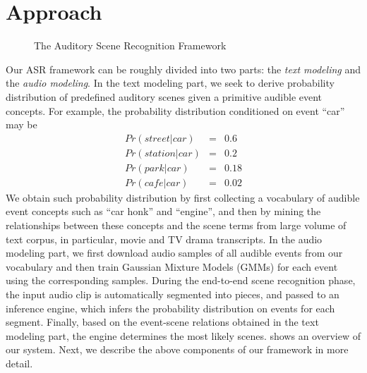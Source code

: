 \section{Approach}
\label{sec:approach}

\begin{figure*}[th]
\centering
{}
\caption{The Auditory Scene Recognition Framework}
\label{fig:sys}
\end{figure*}

Our ASR framework can be roughly divided into two parts: the {\em text 
modeling} and the {\em audio modeling}. In the text modeling part, we seek to
derive probability distribution of predefined auditory scenes given 
a primitive audible event concepts. For example, the probability
distribution conditioned on event ``car'' may be 
\begin{eqnarray*}
Pr(street | car) &=& 0.6\\ 
Pr(station | car) &=& 0.2\\
Pr(park | car) &=& 0.18 \\
Pr(cafe | car) &=& 0.02
\end{eqnarray*}
We obtain such probability distribution by first 
collecting a vocabulary of audible event
concepts such as ``car honk'' and ``engine'', and then by mining the 
relationships between these concepts and the scene terms from large 
volume of text corpus, in particular, movie and TV drama transcripts. 
In the audio modeling part, we first download audio samples of all audible
events from our vocabulary and then train Gaussian Mixture Models (GMMs)
for each event using the corresponding samples. 
During the end-to-end scene recognition phase, the input audio clip 
is automatically segmented into pieces, and passed to an inference engine,
which infers the probability distribution on events for each segment.
Finally, based on the event-scene relations obtained in the text modeling part,
the engine determines the most likely scenes.
 shows an overview of our system. Next, we describe the above 
components of our framework in more detail. 

%





